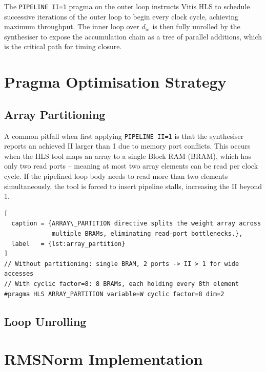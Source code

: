 The \texttt{PIPELINE II=1} pragma on the outer loop instructs Vitis HLS to
schedule successive iterations of the outer loop to begin every clock cycle,
achieving maximum throughput. The inner loop over $d_{\text{in}}$ is then
fully unrolled by the synthesiser to expose the accumulation chain as a
tree of parallel additions, which is the critical path for timing closure.

\lipsum[1] %

\section{Pragma Optimisation Strategy}
\label{sec:pragma_strategy}

\subsection{Array Partitioning}
\label{subsec:array_partition}

A common pitfall when first applying \texttt{PIPELINE II=1} is that the
synthesiser reports an achieved II larger than 1 due to memory port conflicts.
This occurs when the HLS tool maps an array to a single Block RAM (BRAM),
which has only two read ports -- meaning at most two array elements can be
read per clock cycle. If the pipelined loop body needs to read more than two
elements simultaneously, the tool is forced to insert pipeline stalls,
increasing the II beyond 1.

\begin{lstlisting}[
  caption = {ARRAY\_PARTITION directive splits the weight array across
             multiple BRAMs, eliminating read-port bottlenecks.},
  label   = {lst:array_partition}
]
// Without partitioning: single BRAM, 2 ports -> II > 1 for wide accesses
// With cyclic factor=8: 8 BRAMs, each holding every 8th element
#pragma HLS ARRAY_PARTITION variable=W cyclic factor=8 dim=2
\end{lstlisting}

\lipsum[2] %

\subsection{Loop Unrolling}
\label{subsec:loop_unroll}

\lipsum[3] %

\section{RMSNorm Implementation}
\label{sec:rmsnorm_impl}

